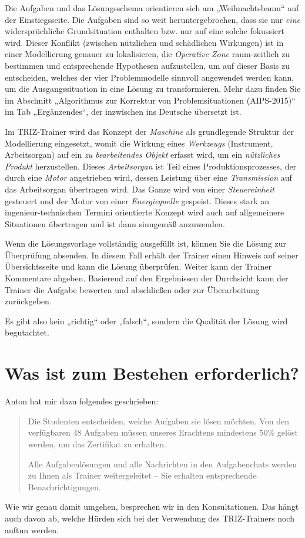 \documentclass[11pt,a4paper]{article}
\begin{document}
Die Aufgaben und das Lösungsschema orientieren sich am „Weihnachtsbaum“ auf
der Einstiegsseite.  Die Aufgaben sind so weit heruntergebrochen, dass sie nur
\emph{eine} widersprüchliche Grundsituation enthalten bzw. nur auf eine solche
fokussiert wird.  Dieser Konflikt (zwischen nützlichen und schädlichen
Wirkungen) ist in einer Modellierung genauer zu lokalisieren, die
\emph{Operative Zone} raum-zeitlich zu bestimmen und entsprechende Hypothesen
aufzustellen, um auf dieser Basis zu entscheiden, welches der vier
Problemmodelle sinnvoll angewendet werden kann, um die Ausgangssituation in
eine Lösung zu transformieren.  Mehr dazu finden Sie im Abschnitt „Algorithmus
zur Korrektur von Problemsituationen (AIPS-2015)“ im Tab „Ergänzendes“, der
inzwischen ins Deutsche übersetzt ist.

Im TRIZ-Trainer wird das Konzept der \emph{Maschine} als grundlegende Struktur
der Modellierung eingesetzt, womit die Wirkung eines \emph{Werkzeugs}
(Instrument, Arbeitsorgan) auf ein \emph{zu bearbeitendes Objekt} erfasst
wird, um ein \emph{nützliches Produkt} herzustellen.  Dieses
\emph{Arbeitsorgan} ist Teil eines Produktionsprozesses, der durch eine
\emph{Motor} angetrieben wird, dessen Leistung über eine \emph{Transmission}
auf das Arbeitsorgan übertragen wird.  Das Ganze wird von einer
\emph{Steuereinheit} gesteuert und der Motor von einer \emph{Energiequelle}
gespeist.  Dieses stark an ingenieur-technischen Termini orientierte Konzept
wird auch auf allgemeinere Situationen übertragen und ist dann sinngemäß
anzuwenden.

Wenn die Lösungsvorlage vollständig ausgefüllt ist, können Sie die Lösung zur
Überprüfung absenden. In diesem Fall erhält der Trainer einen Hinweis auf
seiner Übersichtsseite und kann die Lösung überprüfen.  Weiter kann der
Trainer Kommentare abgeben. Basierend auf den Ergebnissen der Durchsicht kann
der Trainer die Aufgabe bewerten und abschließen oder zur Überarbeitung
zurückgeben.

Es gibt also kein „richtig“ oder „falsch“, sondern die Qualität der Lösung
wird begutachtet. 

\section{Was ist zum Bestehen erforderlich?}

Anton hat mir dazu folgendes geschrieben:
\begin{quote}
  Die Studenten entscheiden, welche Aufgaben sie lösen möchten. Von den
  verfüg\-baren 48 Aufgaben müssen unseres Erachtens mindestens 50\% gelöst
  werden, um das Zertifikat zu erhalten.
  
  Alle Aufgabenlösungen und alle Nachrichten in den Aufgabenchats werden zu
  Ihnen als Trainer weitergeleitet -- Sie erhalten entsprechende
  Benachrichtigungen.
\end{quote}

Wie wir genau damit umgehen, besprechen wir in den Konsultationen. Das hängt
auch davon ab, welche Hürden sich bei der Verwendung des TRIZ-Trainers noch
auftun werden. 
\end{document}
